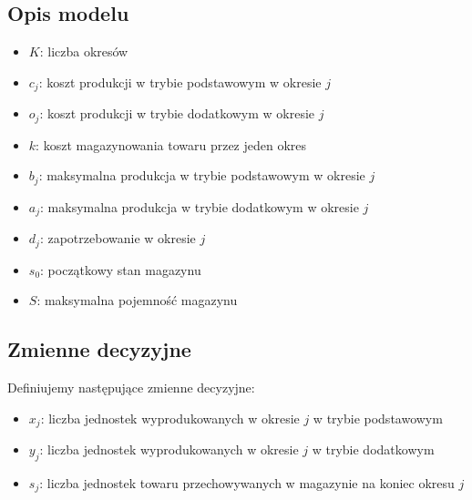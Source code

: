 \documentclass{article}
\begin{document}
\subsection{Opis modelu}
\begin{itemize}
    \item $K$: liczba okresów
    \item $c_j$: koszt produkcji w trybie podstawowym w okresie $j$
    \item $o_j$: koszt produkcji w trybie dodatkowym w okresie $j$
    \item $k$: koszt magazynowania towaru przez jeden okres
    \item $b_j$: maksymalna produkcja w trybie podstawowym w okresie $j$
    \item $a_j$: maksymalna produkcja w trybie dodatkowym w okresie $j$
    \item $d_j$: zapotrzebowanie w okresie $j$
    \item $s_0$: początkowy stan magazynu
    \item $S$: maksymalna pojemność magazynu
\end{itemize}
\subsection{Zmienne decyzyjne}
Definiujemy następujące zmienne decyzyjne:
\begin{itemize}
    \item $x_j$: liczba jednostek wyprodukowanych w okresie $j$ w trybie podstawowym
    \item $y_j$: liczba jednostek wyprodukowanych w okresie $j$ w trybie dodatkowym
    \item $s_j$: liczba jednostek towaru przechowywanych w magazynie na koniec okresu $j$
\end{itemize}
\end{document}
